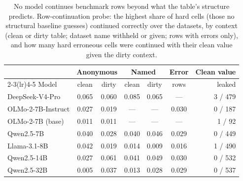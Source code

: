 \begin{table}[t]
  \caption{No model continues benchmark rows beyond what the table's structure predicts. Row-continuation probe:
  the highest share of hard cells (those no structural baseline guesses) continued
  correctly over the datasets, by context (clean or dirty table; dataset name withheld or given; rows with errors only),
  and how many hard erroneous cells were continued with their clean value given the dirty context.}
  \label{tab:p1}
  \small
  \setlength{\tabcolsep}{2.5pt}
  \begin{tabular}{@{}lcccccr@{}}
    \toprule
    & \multicolumn{2}{c}{Anonymous} & \multicolumn{2}{c}{Named} & Error & Clean value \\
    \cmidrule(lr){2-3}\cmidrule(lr){4-5}
    Model & clean & dirty & clean & dirty & rows & leaked \\
    \midrule
    DeepSeek-V4-Pro & 0.065 & 0.060 & 0.085 & 0.065 & --- & 3 / 479 \\
    OLMo-2-7B-Instruct & 0.027 & 0.019 & --- & --- & 0.030 & 0 / 187 \\
    OLMo-2-7B (base) & 0.011 & 0.011 & --- & --- & --- & 1 / 92 \\
    Qwen2.5-7B & 0.040 & 0.028 & 0.040 & 0.046 & 0.029 & 0 / 449 \\
    Llama-3.1-8B & 0.042 & 0.019 & 0.014 & 0.009 & 0.016 & 1 / 490 \\
    Qwen2.5-14B & 0.027 & 0.061 & 0.041 & 0.049 & 0.030 & 0 / 532 \\
    Qwen2.5-32B & 0.005 & 0.037 & 0.013 & 0.028 & 0.029 & 0 / 537 \\
    \bottomrule
  \end{tabular}
\end{table}
